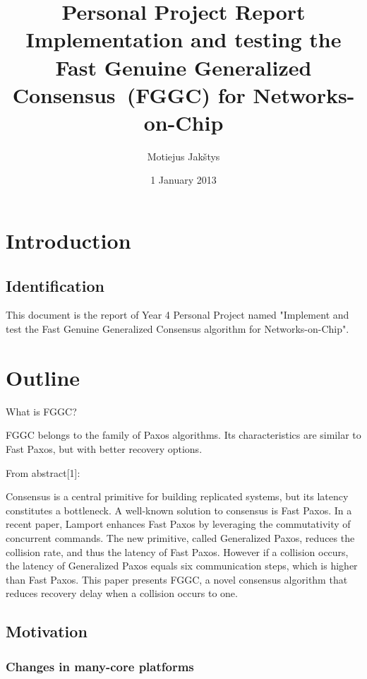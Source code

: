 \documentclass[english,11pt]{article}
\numberwithin{equation}{section}
\newcommand{\fggc}{Fast Genuine Generalized Consensus\ }
\begin{document}
\title{Personal Project Report\\
    Implementation and testing the \fggc (FGGC) for Networks-on-Chip}
\author{Motiejus Jakštys}
\date{1 January 2013}

\maketitle
\pagebreak
\tableofcontents
\pagebreak

\section{Introduction}
\subsection{Identification}

This document is the report of Year 4 Personal Project named "Implement and
test the Fast Genuine Generalized Consensus algorithm for Networks-on-Chip".

\section{Outline}

What is FGGC?

FGGC belongs to the family of Paxos algorithms. Its characteristics are similar
to Fast Paxos, but with better recovery options.

From abstract[1]:

Consensus is a central primitive for building replicated systems, but its
latency constitutes a bottleneck. A well-known solution to consensus is Fast
Paxos. In a recent paper, Lamport enhances Fast Paxos by leveraging the
commutativity of concurrent commands. The new primitive, called Generalized
Paxos, reduces the collision rate, and thus the latency of Fast Paxos. However
if a collision occurs, the latency of Generalized Paxos equals six
communication steps, which is higher than Fast Paxos. This paper presents FGGC,
a novel consensus algorithm that reduces recovery delay when a collision occurs
to one.

\subsection{Motivation}

\subsubsection{Changes in many-core platforms}
\end{document}
